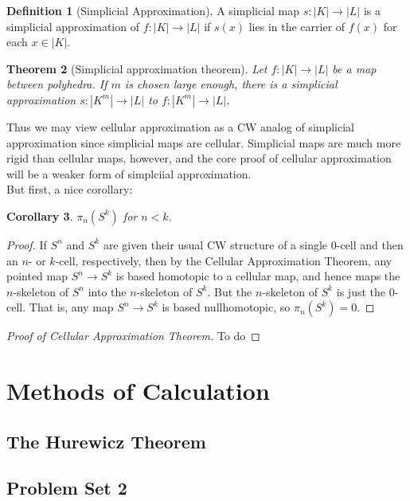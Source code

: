 \documentclass[reqno]{amsart}
\newtheorem{theorem}{Theorem}[section]
\newtheorem{corollary}[theorem]{Corollary}
\theoremstyle{definition}
\newtheorem{definition}[theorem]{Definition}
\theoremstyle{remark}
\begin{document}
\begin{definition}[Simplicial Approximation]
    A simplicial map $s \colon \left| K \right| 
    \to \left| L \right| $ is a simplicial approximation of 
    $f \colon \left| K \right|  \to \left| L \right| $ 
    if $s(x)$ lies in the carrier of $f(x)$ for
    each $x \in \left| K \right| $.
\end{definition}

\begin{theorem}[Simplicial approximation theorem]
    Let $f \colon \left| K \right| \to 
    \left| L \right| $ be a map between polyhedra.
    If $m$ is chosen large enough, there is a simplicial
    approximation $s \colon \left| K^{m} \right| \to 
    \left| L \right| $ to $f \colon \left| K^{m} \right| 
    \to \left| L \right| $.
\end{theorem}

Thus we may view cellular approximation as
a CW analog of simplicial approximation since simplicial
maps are cellular. Simplicial maps are much more rigid
than cellular maps, however, and the core
proof of cellular approximation will be
a weaker form of simplciial approximation.\\
\linebreak
But first, a nice corollary:

\begin{corollary}
    $\pi_n \left( S^{k} \right) $ for
    $n<k$.
\end{corollary}

\begin{proof}
    If $S^{n}$ and $S^{k}$ are given their usual
    CW structure of a single $0$-cell and
    then an $n$- or $k$-cell, respectively, then by
    the Cellular Approximation Theorem, 
    any pointed map $S^{n} \to S^{k}$ is based homotopic to a 
    cellular map, and hence maps
    the  $n$-skeleton of $S^{n}$ into the $n$-skeleton
    of $S^{k}$. But the $n$-skeleton of $S^{k}$ is
    just the $0$-cell. That is, 
    any map $S^{n} \to S^{k}$ is based nullhomotopic, so
    $\pi_n \left( S^{k} \right) = 0$.
\end{proof}

\begin{proof}[Proof of Cellular Approximation Theorem]
    To do
\end{proof}


\section{Methods of Calculation}





\subsection{The Hurewicz Theorem}





\subsection{Problem Set 2}






\newpage

\printbibliography
\end{document}
